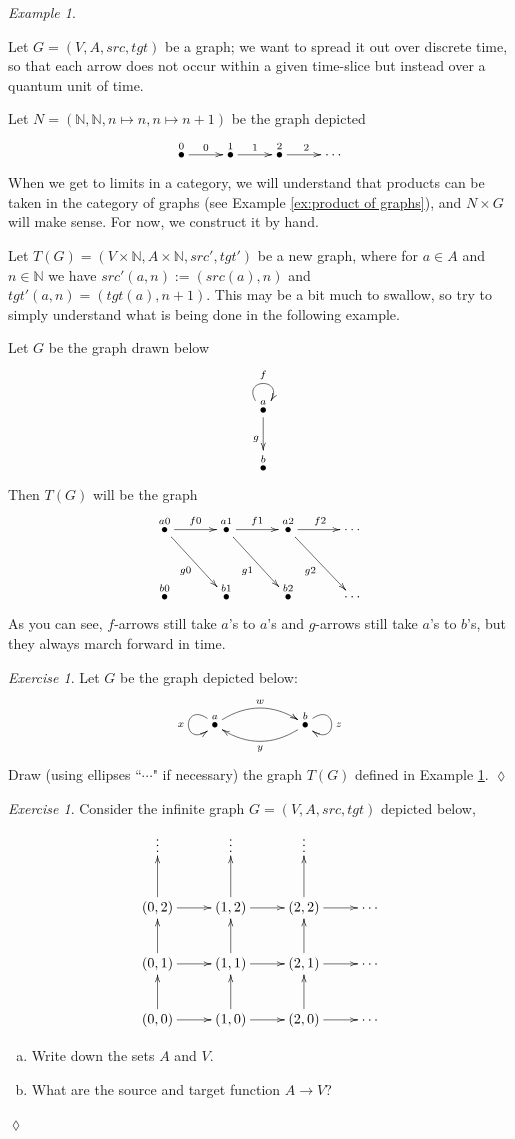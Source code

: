 \documentclass{book}
\def\NN{{\mathbb N}}
\def\to{\rightarrow}
\newcommand{\LMO}[1]{\stackrel{#1}{\bullet}}
\theoremstyle{remark}
\newtheorem{example}[subsubsection]{Example}
\newtheorem{exc}[subsubsection]{Exercise}
\newenvironment{exercise}{\begin{exc}}{\hspace*{\fill}$\lozenge$\end{exc}}
\theoremstyle{definition}
\def\sexc{\begin{enumerate}[a.)]\setlength{\itemsep}{.1cm}\setlength{\parskip}{.1cm}\item}
\def\next{\item}
\def\endsexc{\end{enumerate}}
\begin{document}
\begin{example}\label{ex:ZxG}

Let $G=(V,A,src,tgt)$ be a graph; we want to spread it out over discrete time, so that each arrow does not occur within a given time-slice but instead over a quantum unit of time. 

Let $N=(\NN,\NN,n\mapsto n,n\mapsto n+1)$ be the graph depicted 
$$\xymatrix{\LMO{0}\ar[r]^0&\LMO{1}\ar[r]^1&\LMO{2}\ar[r]^2&\cdots}$$
When we get to limits in a category, we will understand that products can be taken in the category of graphs (see  Example \ref{ex:product of graphs}), and $N\times G$ will make sense. For now, we construct it by hand.

Let $T(G)=(V\times \NN,A\times\NN,src',tgt')$ be a new graph, where for $a\in A$ and $n\in\NN$ we have $src'(a,n):=(src(a),n)$ and $tgt'(a,n)=(tgt(a),n+1)$. This may be a bit much to swallow, so try to simply understand what is being done in the following example. 

Let $G$ be the graph drawn below 
$$\xymatrix{\LMO{a}\ar@(ul,ur)[]^f\ar[d]_g\\\LMO{b}}$$
Then $T(G)$ will be the graph 
$$\xymatrix@=30pt{
\LMO{a0}\ar[r]^{f0}\ar[rd]_{g0}&\LMO{a1}\ar[r]^{f1}\ar[rd]_{g1}&\LMO{a2}\ar[r]^{f2}\ar[rd]_{g2}&\cdots\\
\LMO{b0}&\LMO{b1}&\LMO{b2}&\cdots
}
$$
As you can see, $f$-arrows still take $a$'s to $a$'s and $g$-arrows still take $a$'s to $b$'s, but they always march forward in time.

\end{example}

\begin{exercise}\label{exc:secret turing}
Let $G$ be the graph depicted below:
$$
\xymatrix{\LMO{a}\ar@/^1pc/[rr]^w\ar@(lu,ld)[]_x&&\LMO{b}\ar@/^1pc/[ll]^y\ar@(ur,dr)[]^z}
$$
Draw (using ellipses ``$\cdots$" if necessary) the graph $T(G)$ defined in Example \ref{ex:ZxG}.
\end{exercise}

\begin{exercise}\label{exc:lattice}
Consider the infinite graph $G=(V,A,src,tgt)$ depicted below,
$$
\xymatrix{
\vdots&\vdots&\vdots\\
(0,2)\ar[r]\ar[u]&(1,2)\ar[r]\ar[u]&(2,2)\ar[r]\ar[u]&\cdots\\
(0,1)\ar[r]\ar[u]&(1,1)\ar[r]\ar[u]&(2,1)\ar[r]\ar[u]&\cdots\\
(0,0)\ar[r]\ar[u]&(1,0)\ar[r]\ar[u]&(2,0)\ar[r]\ar[u]&\cdots}
$$
\sexc Write down the sets $A$ and $V$. 
\next What are the source and target function $A\to V$?  
\endsexc
\end{exercise}
\end{document}
